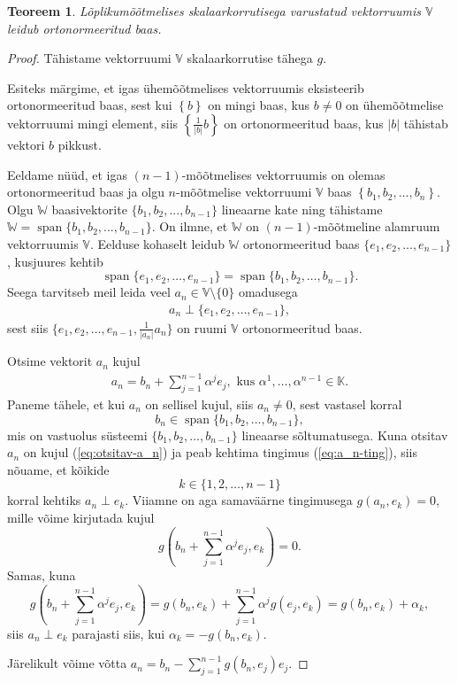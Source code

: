 \documentclass[12pt,a4paper,oneside]{article}
\theoremstyle{plain}
\newtheorem{teoreem}{Teoreem}[section]
\theoremstyle{definition}
\numberwithin{equation}{section}
\def\K{{\mathbb K}}
\def\V{{\mathbb V}}
\def\W{{\mathbb W}}
\DeclareMathOperator{\spn}{span}
\begin{document}
\begin{teoreem} \label{teoreem:gram-schmidt}
Lõplikumõõtmelises skalaarkorrutisega \mbox{varustatud} vektorruumis 
$\V$ leidub ortonormeeritud baas.
\end{teoreem}
\begin{proof}
Tähistame vektorruumi $\V$ skalaarkorrutise tähega $g$.

Esiteks märgime, et igas ühemõõtmelises vektorruumis eksisteerib 
ortonormeeritud baas, sest kui $\left\lbrace b \right\rbrace$ on 
mingi baas, kus $b \neq 0$ on ühemõõtmelise vektor\-ruumi \mbox{mingi} 
element, siis $\left\lbrace \frac{1}{|b|} b\right\rbrace$ on 
ortonormeeritud baas, kus $|b|$ tähistab vektori $b$ \mbox{pikkust}.

Eeldame nüüd, et igas $(n-1)$-mõõtmelises vektorruumis on olemas 
ortonormeeritud baas ja olgu $n$-mõõtmelise vektorruumi 
$\V$ baas $\left\lbrace b_1, b_2, \dots, b_n \right\rbrace$. 
Olgu $\W$ baasivektorite $\{b_1,b_2,...,b_{n-1}\}$ lineaarne kate 
ning tähistame $\W = \spn\{b_1,b_2,...,b_{n-1}\}$. 
On ilmne, et $\W$ on $(n-1)$-mõõtmeline alamruum vektorruumis 
$\V$. Eelduse kohaselt leidub $\W$ ortonormeeritud baas 
$\{e_1,e_2,...,e_{n-1}\}$, kusjuures kehtib
\[ \spn\{ e_1, e_2, \dots, e_{n-1}\} = 
\spn\{ b_1, b_2, \dots, b_{n-1}\}. \]
Seega tarvitseb meil leida veel $a_n \in \V \setminus \{0\}$ 
omadusega
\begin{align} \label{eq:a_n-ting}
a_n \perp \{ e_1, e_2, \dots, e_{n-1}\},
\end{align}
sest siis $\{ e_1, e_2, \dots, e_{n-1}, \frac{1}{|a_n|}a_n\}$ on 
ruumi $\V$ ortonormeeritud baas.

Otsime vektorit $a_n$ kujul
\begin{align} \label{eq:otsitav-a_n}
a_n = b_n + \sum_{j = 1}^{n-1} \alpha^j e_j, 
\text{ kus } \alpha^1, \dots, \alpha^{n-1} \in \K.
\end{align}
Paneme tähele, et kui $a_n$ on sellisel kujul, siis $a_n \neq 0$, 
sest vastasel korral 
\[b_n \in \spn\{ b_1, b_2, \dots, b_{n-1}\},\] 
mis on vastuolus süsteemi $\{ b_1, b_2, \dots, b_{n-1}\}$ 
lineaarse sõltu\-matusega.
Kuna otsitav $a_n$ on kujul (\ref{eq:otsitav-a_n}) ja peab kehtima 
tingimus (\ref{eq:a_n-ting}), siis nõuame, et 
kõikide 
\[k \in \{1, 2, \dots, n-1\}\]
korral kehtiks 
$a_n \perp e_k$. Viiamne on aga samaväärne tingimusega 
$g\left(a_n, e_k\right) = 0$, mille võime kirjutada kujul 
\[g\left(b_n + \sum_{j = 1}^{n-1} \alpha^j e_j, e_k \right) = 0.\]
Samas, kuna
\begin{equation*}
g\left(b_n + \sum_{j = 1}^{n-1} \alpha^j e_j, e_k \right)= 
g\left(b_n, e_k\right) + \sum_{j = 1}^{n-1} 
	\alpha^j g\left(e_j, e_k \right) 
= g\left(b_n, e_k\right) + \alpha_k,
\end{equation*}
siis $a_n \perp e_k$ parajasti siis, kui 
$\alpha_k = - g\left(b_n, e_k\right)$. 

Järelikult võime võtta 
$a_n = b_n - \sum_{j=1}^{n-1}g\left(b_n, e_j\right)e_j$.
\end{proof}
\end{document}
